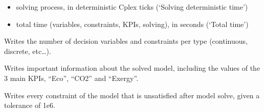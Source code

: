 \documentclass[letterpaper,10pt,english]{sphinxmanual}
\begin{document}
\begin{fulllineitems}
\begin{fulllineitems}
\begin{itemize}
\item {} 
\sphinxAtStartPar
solving process, in deterministic Cplex ticks (‘Solving deterministic time’)

\item {} 
\sphinxAtStartPar
total time (variables, constraints, KPIs, solving), in seconds (‘Total time’)

\end{itemize}

\end{fulllineitems}


\begin{fulllineitems}
\label{\detokenize{generated/tamos.data_IO.ResultsExport:tamos.data_IO.ResultsExport.write_model_complexity}}
\pysigstartsignatures
{}
\pysigstopsignatures
\sphinxAtStartPar
Writes the number of decision variables and constraints per type (continuous, discrete, etc…).

\end{fulllineitems}


\begin{fulllineitems}
\label{\detokenize{generated/tamos.data_IO.ResultsExport:tamos.data_IO.ResultsExport.write_solution_summary}}
\pysigstartsignatures
{}
\pysigstopsignatures
\sphinxAtStartPar
Writes important information about the solved model, including the values of the 3 main KPIs, “Eco”, “CO2” and “Exergy”.

\end{fulllineitems}


\begin{fulllineitems}
\label{\detokenize{generated/tamos.data_IO.ResultsExport:tamos.data_IO.ResultsExport.write_unsatisfied_constraints}}
\pysigstartsignatures
{}
\pysigstopsignatures
\sphinxAtStartPar
Writes every constraint of the model that is unsatisfied after model solve, given a tolerance of 1e\sphinxhyphen{}6.


\end{fulllineitems}
\end{fulllineitems}
\end{document}
